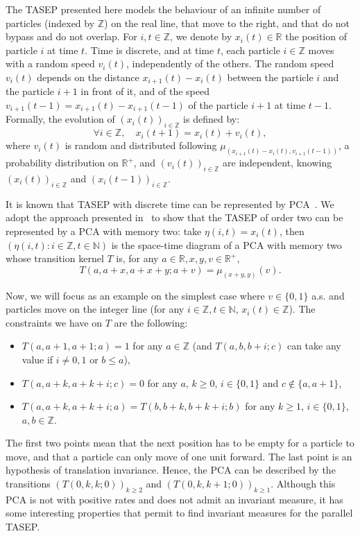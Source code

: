 \documentclass[AHL,Unicode,longabstracts]{cedram}
\newcounter{a}
\newcommand{\NN}{\mathbb{N}}
\newcommand{\ZZ}{\mathbb{Z}}
\newcommand{\Z}{\mathbb{Z}}
\newcommand{\RR}{\mathbb{R}}
\let\oldforall\forall
\renewcommand*{\forall}{\mathrel{\oldforall}}
\begin{document}
The TASEP presented here models the behaviour of an infinite number of particles (indexed by $\ZZ$) on the real line, that move to the right, and that do not bypass and do not overlap. For $i,t\in\Z$, we denote by $x_i(t)\in \RR$ the position of particle $i$ at time $t$. Time is discrete, and at time $t$, each particle $i\in\ZZ$ moves with a random speed $v_i(t)$, independently of the others. The random speed $v_i(t)$ depends on the distance $x_{i+1}(t)-x_i(t)$ between the particle $i$ and the particle $i+1$ in front of it, and of the speed $v_{i+1}(t-1)=x_{i+1}(t)-x_{i+1}(t-1)$ of the particle $i+1$ at time $t-1$. Formally, the evolution of $(x_i(t))_{i \in \ZZ}$ is defined by:
\begin{equation*}
\forall i\in\ZZ, \quad x_i(t+1) = x_i(t) + v_i(t),
\end{equation*}
where $v_i(t)$ is random and distributed following $\mu_{(x_{i+1}(t)-x_i(t),v_{i+1}(t-1))}$, a probability distribution on $\RR^+$, and $(v_i(t))_{i \in \ZZ}$ are independent, knowing $(x_i(t))_{i\in \ZZ}$ and \linebreak$(x_{i}(t-1))_{i \in \ZZ}$.



It is known that TASEP with discrete time can be represented by PCA~\cite{Casse16,mm_tcs}. We adopt the approach presented in~\cite{Casse16} to show that the TASEP of order two can be represented by a PCA with memory two: take $\eta(i,t) = x_i(t)$, then $(\eta(i,t) : i \in \ZZ, t \in \NN)$ is the space-time diagram of a PCA with memory two whose transition kernel $T$ is, for any $a \in \RR, x,y,v \in \RR^+$,
\begin{equation*}
T(a,a+x,a+x+y;a+v) = \mu_{(x+y,y)}(v).
\end{equation*}


Now, we will focus as an example on the simplest case where $v \in \{0,1\}$ a.s. and particles move on the integer line (for any $i\in\ZZ,t\in\NN$, $x_i(t) \in \ZZ$). The constraints we have on $T$ are the following:
\begin{itemize}
\item $T(a,a+1,a+1;a) =1$ for any $a\in \ZZ$ (and $T(a,b,b+i;c)$ can take any value if $i \neq 0,1$ or $b \leq a$),
\item $T(a,a+k,a+k+i;c) = 0$ for any $a$, $k \geq 0$, $i \in \{0,1\}$ and $c \notin \{a,a+1\}$,
\item $T(a,a+k,a+k+i;a) = T(b,b+k,b+k+i;b)$ for any $k\geq 1$, $i \in \{0,1\}$, $a,b \in \ZZ$.
\end{itemize}
The first two points mean that the next position has to be empty for a particle to move, and that a particle can only move of one unit forward. The last point is an hypothesis of translation invariance. Hence, the PCA can be described by the transitions $(T(0,k,k;0))_{k \geq 2}$ and $(T(0,k,k+1;0))_{k \geq 1}$. Although this PCA is not with positive rates and does not admit an invariant measure, it has some interesting properties that permit to find invariant measures for the parallel TASEP.
\end{document}
